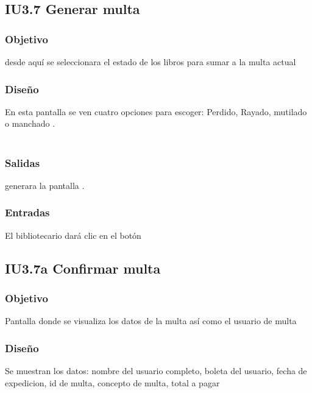 \newpage
\subsection{IU3.7 Generar multa}

\subsubsection{Objetivo}
	desde aquí se seleccionara el estado de los libros para sumar a la multa actual

\subsubsection{Diseño}
	En esta pantalla se ven cuatro opciones para escoger: Perdido, Rayado, mutilado o manchado  .  \\\\


\subsubsection{Salidas}
	\begin{Citemize}
		\item generara la pantalla . 
	\end{Citemize}
	
\subsubsection{Entradas}
	\begin{Citemize}
		\item El bibliotecario dará clic en el botón \IUbutton{Confirmar}
	\end{Citemize}




\subsection{IU3.7a Confirmar multa}

\subsubsection{Objetivo}
	Pantalla donde se visualiza los datos de la multa así como el usuario de multa

\subsubsection{Diseño}
	Se muestran los datos: nombre del usuario completo, boleta del usuario, fecha de expedicion, id de multa, concepto de multa, total a pagar  \\\\

